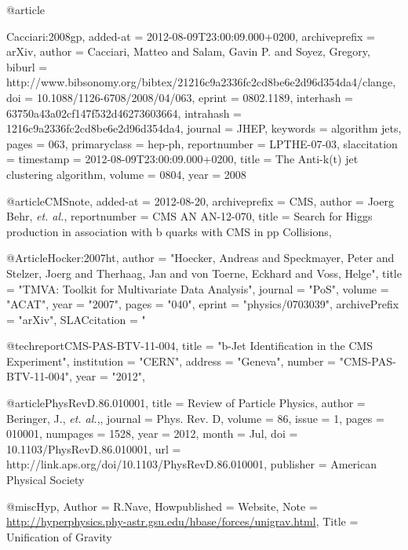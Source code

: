 




@article{Cacciari:2008gp,
  added-at = {2012-08-09T23:00:09.000+0200},
  archiveprefix = {arXiv},
  author = {Cacciari, Matteo and Salam, Gavin P. and Soyez, Gregory},
  biburl = {http://www.bibsonomy.org/bibtex/21216c9a2336fc2cd8be6e2d96d354da4/clange},
  doi = {10.1088/1126-6708/2008/04/063},
  eprint = {0802.1189},
  interhash = {63750a43a02cf147f532d46273603664},
  intrahash = {1216c9a2336fc2cd8be6e2d96d354da4},
  journal = {JHEP},
  keywords = {algorithm jets},
  pages = 063,
  primaryclass = {hep-ph},
  reportnumber = {LPTHE-07-03},
  slaccitation = {%
  timestamp = {2012-08-09T23:00:09.000+0200},
  title = {{The Anti-k(t) jet clustering algorithm}},
  volume = 0804,
  year = 2008
}

@article{CMSnote,
  added-at = {2012-08-20},
  archiveprefix = {CMS},
  author = {Joerg Behr, \emph{et. al.}},
  reportnumber = {CMS AN AN-12-070},
  title = {Search for Higgs production in association with b quarks with CMS in pp Collisions},
}

@Article{Hocker:2007ht, 
author	=	 "Hoecker, Andreas and Speckmayer, Peter and Stelzer, Joerg and Therhaag, Jan and von Toerne, Eckhard and Voss, Helge",
title	 = 	 "{TMVA: Toolkit for Multivariate Data Analysis}",
journal	 = 	 "PoS",
volume	 = 	 "ACAT",
year	 = 	 "2007",
pages	 = 	 "040",
eprint	 = 	 "physics/0703039",
archivePrefix	 = 	 "arXiv",
SLACcitation	 = 	 "%
}

@techreport{CMS-PAS-BTV-11-004,
      title        = "b-Jet Identification in the CMS Experiment",
      institution  = "CERN",
      address      = "Geneva",
      number       = "CMS-PAS-BTV-11-004",
      year         = "2012",
}


@article{PhysRevD.86.010001,
  title = {Review of Particle Physics},
  author = {Beringer, J., \emph{et. al.},},
  journal = {Phys. Rev. D},
  volume = {86},
  issue = {1},
  pages = {010001},
  numpages = {1528},
  year = {2012},
  month = {Jul},
  doi = {10.1103/PhysRevD.86.010001},
  url = {http://link.aps.org/doi/10.1103/PhysRevD.86.010001},
  publisher = {American Physical Society}
}

@misc{Hyp,
	Author = {R.Nave},
	Howpublished = {Website},
	Note = {\url{http://hyperphysics.phy-astr.gsu.edu/hbase/forces/unigrav.html}},
	Title = {Unification of Gravity}}

}
